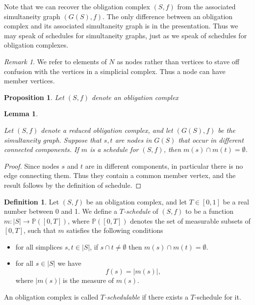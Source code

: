 \documentclass{amsart}
\def\PP{{\mathbb P}}
\def\to{\rightarrow}
\def\taking{\colon}
\newtheorem{lemma}[theorem]{Lemma}
\newtheorem{proposition}[theorem]{Proposition}
\theoremstyle{remark}
\newtheorem{remark}[theorem]{Remark}
\theoremstyle{definition}
\newtheorem{definition}[theorem]{Definition}
\begin{document}
Note that we can recover the obligation complex $(S,f)$ from the associated simultaneity graph $(G(S),f)$. The only difference between an obligation complex and its associated simultaneity graph is in the presentation. Thus we may speak of schedules for simultaneity graphs, just as we speak of schedules for obligation complexes. 

\begin{remark} 

We refer to elements of $N$ as nodes rather than vertices to stave off confusion with the vertices in a simplicial complex. Thus a node can have member vertices.

\end{remark}

\begin{proposition}

Let $(S,f)$ denote an obligation complex

\end{proposition}

\begin{lemma}\label{lemma:components}

Let $(S,f)$ denote a reduced obligation complex, and let $(G(S),f)$ be the simultaneity graph. Suppose that $s,t$ are nodes in $G(S)$ that occur in different connected components. If $m$ is a schedule for $(S,f)$, then $m(s)\cap m(t)=\emptyset$.

\end{lemma}

\begin{proof}

Since nodes $s$ and $t$ are in different components, in particular there is no edge connecting them. Thus they contain a common member vertex, and the result follows by the definition of schedule.

\end{proof}

\begin{definition}

Let $(S,f)$ be an obligation complex, and let $T\in[0,1]$ be a real number between 0 and 1. We define a {\em $T$-schedule} of $(S,f)$ to be a function $m\taking|S|\to\PP([0,T])$, where $\PP([0,T])$ denotes the set of measurable subsets of $[0,T]$, such that $m$ satisfies the following conditions \begin{itemize}\item for all simplices $s,t\in |S|$, if  $s\cap t\neq\emptyset$ then  $m(s)\cap m(t)=\emptyset.$\item for all $s\in |S|$ we have $$f(s)=|m(s)|,$$ where $|m(s)|$ is the measure of $m(s)$. \end{itemize}

An obligation complex is called {\em $T$-schedulable} if there exists a $T$-schedule for it.

\end{definition}
\end{document}
